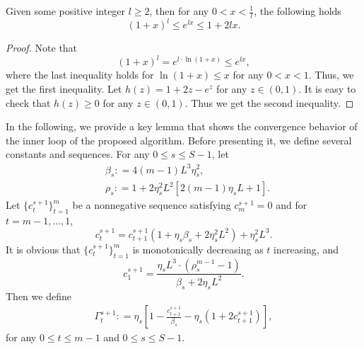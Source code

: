 \documentclass[./sbb_ordinal_embedding_aaai18.tex]{subfiles}%
\begin{document}
\begin{lemma}
\label{lemma:analytic}
Given some positive integer $l\geq 2$, then for any $0<x<\frac{1}{l}$, the following holds
\[
(1+x)^l \leq e^{l x} \leq 1 + 2 l x.
\]
\end{lemma}
\begin{proof}
Note that
\[(1+x)^l = e^{l\cdot \ln(1+x)} \leq e^{lx},\]
where the last inequality holds for $\ln(1+x) \leq x$ for any $0<x<1$. Thus, we get the first inequality. Let $h(z) = 1+2z-e^z$ for any $z\in (0,1)$. It is easy to check that $h(z) \geq 0$ for any $z \in (0,1)$. Thus we get the second inequality.
\end{proof}

In the following, we provide a key lemma that shows the convergence behavior of the inner loop of the proposed algorithm.
Before presenting it, we define several constants and sequences. For any $0\leq s \leq S-1$, let
\begin{align}
&\beta_s : = 4(m-1)L^3 \eta_s^2, \label{eq:batas}\\
&\rho_s : = 1+2\eta_s^2L^2[2(m-1)\eta_sL+1]\label{eq:rhos}.
\end{align}
Let $\{c_t^{s+1}\}_{t=1}^m$ be a nonnegative sequence satisfying $c_m^{s+1}=0$ and for $ t = m-1,\ldots,1$,
\[
c_t^{s+1} = c_{t+1}^{s+1} \left( 1+\eta_s \beta_s + 2\eta_s^2 L^2\right) + \eta_s^2 L^3.
\]
It is obvious that $\{c_t^{s+1}\}_{t=1}^m$ is monotonically decreasing as $t$ increasing, and
\[
c_1^{s+1} = \frac{\eta_s L^3 \cdot (\rho_s^{m-1}-1)}{\beta_s + 2\eta_s L^2}.
\]
Then we define
\begin{align}
\label{eq:Gammas}
\Gamma_t^{s+1} : = \eta_s \left[ 1-\frac{c_{t+1}^{s+1}}{\beta_s} - \eta_s (1+2c_{t+1}^{s+1})\right],
\end{align}
for any $0\leq t \leq m-1$ and $0 \leq  s \leq S-1$.
\end{document}
